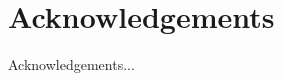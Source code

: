 \chapter*{Acknowledgements}
\nopagebreak
\label{chap:acknowledgements}
\thispagestyle{empty}

Acknowledgements...

\clearpage
\pagestyle{regular}
